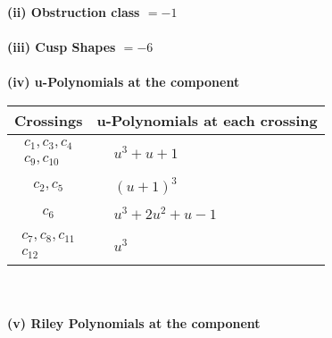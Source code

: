 \documentclass[1p]{elsarticle_modified}
\theoremstyle{definition}
\begin{document}
\flushleft \textbf{(ii) Obstruction class $= -1$}\\~\\
\flushleft \textbf{(iii) Cusp Shapes $= -6$}\\~\\
\newpage\renewcommand{\arraystretch}{1}
\flushleft \textbf{(iv) u-Polynomials at the component}\newline \\
\begin{tabular}{m{50pt}|m{274pt}}
Crossings & \hspace{64pt}u-Polynomials at each crossing \\
\hline $$\begin{aligned}c_{1},c_{3},c_{4}\\c_{9},c_{10}\end{aligned}$$&$\begin{aligned}
&u^3+u+1
\end{aligned}$\\
\hline $$\begin{aligned}c_{2},c_{5}\end{aligned}$$&$\begin{aligned}
&(u+1)^3
\end{aligned}$\\
\hline $$\begin{aligned}c_{6}\end{aligned}$$&$\begin{aligned}
&u^3+2 u^2+u-1
\end{aligned}$\\
\hline $$\begin{aligned}c_{7},c_{8},c_{11}\\c_{12}\end{aligned}$$&$\begin{aligned}
&u^3
\end{aligned}$\\
\hline
\end{tabular}\\~\\
\newpage\renewcommand{\arraystretch}{1}
\flushleft \textbf{(v) Riley Polynomials at the component}\newline \\
\end{document}
